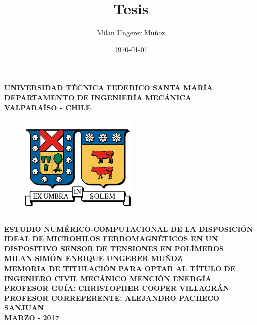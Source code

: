 \documentclass[12pt,letterpaper]{article}
\title{Tesis}
\author{Milan Ungerer Muñoz}
\date{\today}
\numberwithin{equation}{section}
\begin{document}
\begin{titlepage}
	
	\begin{center}
		\vspace*{-1in}
		
		\Large \textbf{UNIVERSIDAD TÉCNICA FEDERICO SANTA MARÍA}\\
		\vspace*{0.15in}
		\large \textbf{DEPARTAMENTO DE INGENIERÍA MECÁNICA} \\
		\vspace*{0.15in}
		\textbf{VALPARAÍSO - CHILE}
		
		\begin{figure}[h!]
			\centering\includegraphics[height=50mm]{Imagenes/Logo_UTFSM.png}
		\end{figure}
		\vspace*{0.15in}
		\Large \textbf{ESTUDIO NUMÉRICO-COMPUTACIONAL DE LA DISPOSICIÓN IDEAL DE MICROHILOS FERROMAGNÉTICOS EN UN DISPOSITIVO SENSOR DE TENSIONES EN POLÍMEROS}\\
		\vspace*{1in}
		\large\centering \textbf{MILAN SIMÓN ENRIQUE UNGERER MUÑOZ}\\
		\vspace*{0.15in}
		\centering\normalsize \textbf{MEMORIA DE TITULACIÓN PARA OPTAR AL TÍTULO DE INGENIERO CIVIL MECÁNICO MENCIÓN ENERGÍA}\\
		\vspace*{0.6in}
		\centering\normalsize \textbf{PROFESOR GUÍA: \hspace{2.5cm} CHRISTOPHER COOPER VILLAGRÁN}\\
		\vspace*{0.15in}
		\centering\normalsize \textbf{PROFESOR CORREFERENTE: \hspace{1cm} ALEJANDRO PACHECO SANJUAN}\\
		\vspace*{1in}
		\centering\normalsize \textbf{MARZO - 2017}\\
	\end{center}
	
\end{titlepage}
\newpage\null\thispagestyle{empty}\newpage
\end{document}
